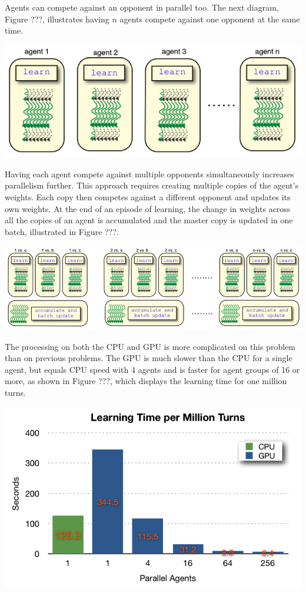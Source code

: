 \documentclass[11pt]{article} %
\begin{document}
\begin{flushleft}


Agents can compete against an opponent in parallel too.  The next diagram, Figure ???, illustrates having $n$ agents compete against one opponent at the same time.

\end{flushleft}
\center
\includegraphics[scale=0.8]{fig15}
\begin{flushleft}

Having each agent compete against multiple opponents simultaneously increases parallelism further.  This approach requires creating multiple copies of the agent’s weights.  Each copy then competes against a different opponent and updates its own weights.  At the end of an episode of learning, the change in weights across all the copies of an agent is accumulated and the master copy is updated in one batch, illustrated in Figure ???.

\end{flushleft}
\center
\includegraphics[scale=0.8]{fig16}
\begin{flushleft}


The processing on both the CPU and GPU is more complicated on this problem than on previous problems.  The GPU is much slower than the CPU for a single agent, but equals CPU speed with 4 agents and is faster for agent groups of 16 or more, as shown in Figure ???, which displays the learning time for one million turns.

\end{flushleft}
\center
\includegraphics[scale=0.8]{fig17}
\end{document}
